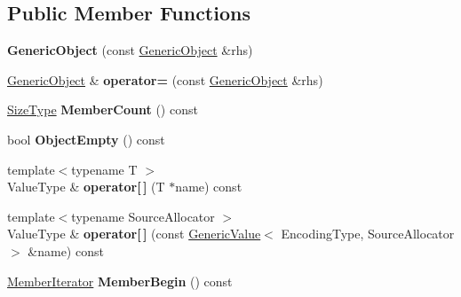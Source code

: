 \subsection*{Public Member Functions}
\begin{DoxyCompactItemize}
\item 
\mbox{\label{class_generic_object_a10173c42d0e8a71ca0e3ae75d800887a}} 
{\bfseries Generic\+Object} (const \hyperlink{class_generic_object}{Generic\+Object} \&rhs)
\item 
\mbox{\label{class_generic_object_af8984f76d6f3b13039c6d3b8e217f747}} 
\hyperlink{class_generic_object}{Generic\+Object} \& {\bfseries operator=} (const \hyperlink{class_generic_object}{Generic\+Object} \&rhs)
\item 
\mbox{\label{class_generic_object_a15326564c82f2b545811f753534563e4}} 
\hyperlink{rapidjson_8h_a5ed6e6e67250fadbd041127e6386dcb5}{Size\+Type} {\bfseries Member\+Count} () const
\item 
\mbox{\label{class_generic_object_a9cc10bfeeb6a5eb95ba1ae587b6e6ad8}} 
bool {\bfseries Object\+Empty} () const
\item 
\mbox{\label{class_generic_object_a2d8c758d10e7c7ab23e3904d5936b204}} 
{\footnotesize template$<$typename T $>$ }\\Value\+Type \& {\bfseries operator\mbox{[}$\,$\mbox{]}} (T $\ast$name) const
\item 
\mbox{\label{class_generic_object_a19bfc1bd98b120d42e7d50db0886614a}} 
{\footnotesize template$<$typename Source\+Allocator $>$ }\\Value\+Type \& {\bfseries operator\mbox{[}$\,$\mbox{]}} (const \hyperlink{class_generic_value}{Generic\+Value}$<$ Encoding\+Type, Source\+Allocator $>$ \&name) const
\item 
\mbox{\label{class_generic_object_af1e80a8a521f05530f9b6a448242ff2d}} 
\hyperlink{class_generic_member_iterator}{Member\+Iterator} {\bfseries Member\+Begin} () const
\item 
\mbox{\label{class_generic_object_a75873786614f67796bfb190008e004dc}} 

\end{DoxyCompactItemize}
